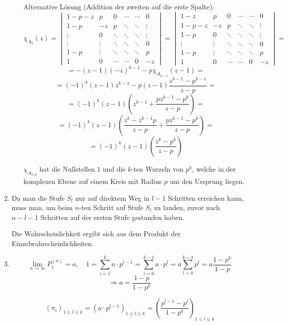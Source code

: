 \begin{enumerate}
\begin{itemize}
      Alternative Lösung (Addition der zweiten auf die erste Spalte):
      \[ \chi_{A_{k}}(z) = \begin{vmatrix}
                            1-p-z & p  & 0  & \cdots & \cdots & 0 \\
                            1-p & -z & p  & \ddots & \ddots & \vdots \\
                            \vdots & 0  & \ddots & \ddots & \ddots & \vdots \\
                            \vdots & \vdots  & \ddots & \ddots & \ddots & 0 \\
                            1-p & \vdots  & \ddots & \ddots & \ddots & p \\
                            1 & 0 & \cdots & \cdots & 0 & -z
                           \end{vmatrix}
                        = \begin{vmatrix}
                            1-z & p  & 0  & \cdots & \cdots & 0 \\
                            1-p-z & -z & p  & \ddots & \ddots &\vdots \\
                            1-p & 0  & \ddots & \ddots & \ddots & \vdots \\
                            \vdots & \vdots  & \ddots & \ddots & \ddots & 0 \\
                            1-p & \vdots  & \ddots & \ddots & \ddots & p \\
                            1 & 0 & \cdots & \cdots & 0 & -z
                           \end{vmatrix} = \]
      \[ = -(z - 1) (-z)^{k-1} - p\chi_{A_{k-1}}(z-1) = \]
      \[ = (-1)^{k}(z - 1) z^{k-1} - p(z-1)\frac{z^{k-1}-p^{k-1}}{z-p} = \]
      \[ = (-1)^{k}(z - 1) \left( z^{k-1} + \frac{pz^{k-1}-p^{k}}{z-p} \right) = \]
      \[ = (-1)^{k}(z - 1) \left( \frac{z^{k}-z^{k-1}p}{z-p} +
                          \frac{pz^{k-1}-p^{k}}{z-p} \right) = \]
      \[ = (-1)^{k}(z - 1) \left( \frac{z^{k}-p^{k}}{z-p} \right) \]

      $\chi_{A_{k,p}}$ hat die Nullstellen $1$ und die $k$-ten Wurzeln von
      $p^{k}$, welche in der komplexen Ebene auf einem Kreis mit Radius $p$ um
      den Ursprung liegen.
  \end{itemize}

\item
  Da man die Stufe $S_{l}$ nur auf direktem Weg in $l - 1$ Schritten erreichen
  kann, muss man, um beim $n$-ten Schritt auf Stufe $S_{l}$ zu landen, zuvor
  nach $n - l - 1$ Schritten auf der ersten Stufe gestanden haben.

  Die Wahrscheinlichkeit ergibt sich aus dem Produkt der
  Einzelwahrscheinlichkeiten.

  \item
   \[ \lim_{n\rightarrow\infty} P_{1}^{(n)} = a, \quad
      1 = \sum_{i=1}^{k} a \cdot p^{l-1} = \sum_{i=0}^{k-1} a \cdot p^{l} = a
   \sum_{l=0}^{k-1} p^{l} = a \frac{1-p^{k}}{1-p} \]
  \[ \Rightarrow a = \frac{1-p}{1-p^{k}} \]

  \[ (\pi_{i})_{1\leq l\leq k} = (a\cdot p^{l-1})_{1\leq l\leq k} 
     = (\frac{p^{l-1} - p^{l}}{1-p^{k}})_{1\leq l\leq k} \]
\end{enumerate}
